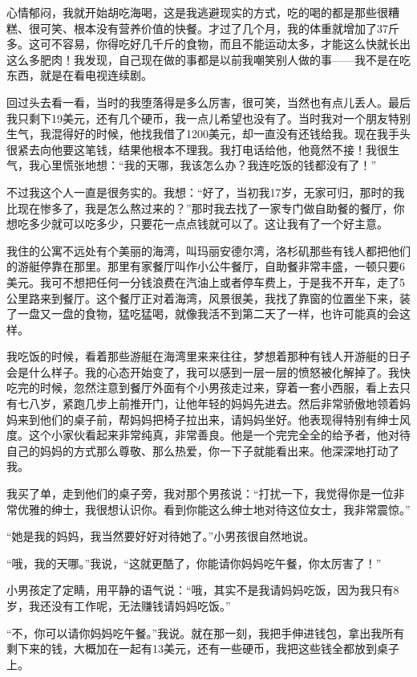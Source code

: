 心情郁闷，我就开始胡吃海喝，这是我逃避现实的方式，吃的喝的都是那些很糟糕、很可笑、根本没有营养价值的快餐。才过了几个月，我的体重就增加了37斤多。这可不容易，你得吃好几千斤的食物，而且不能运动太多，才能这么快就长出这么多肥肉！我发现，自己现在做的事都是以前我嘲笑别人做的事——我不是在吃东西，就是在看电视连续剧。

回过头去看一看，当时的我堕落得是多么厉害，很可笑，当然也有点儿丢人。最后我只剩下19美元，还有几个硬币，我一点儿希望也没有了。当时我对一个朋友特别生气，我混得好的时候，他找我借了1200美元，却一直没有还钱给我。现在我手头很紧去向他要这笔钱，结果他根本不理我。我打电话给他，他竟然不接！我很生气，我心里慌张地想：“我的天哪，我该怎么办？我连吃饭的钱都没有了！”

不过我这个人一直是很务实的。我想：“好了，当初我17岁，无家可归，那时的我比现在惨多了，我是怎么熬过来的？”那时我去找了一家专门做自助餐的餐厅，你想吃多少就可以吃多少，只要花一点点钱就可以了。这让我有了一个好主意。

我住的公寓不远处有个美丽的海湾，叫玛丽安德尔湾，洛杉矶那些有钱人都把他们的游艇停靠在那里。那里有家餐厅叫作小公牛餐厅，自助餐非常丰盛，一顿只要6美元。我可不想把任何一分钱浪费在汽油上或者停车费上，于是我不开车，走了5公里路来到餐厅。这个餐厅正对着海湾，风景很美，我找了靠窗的位置坐下来，装了一盘又一盘的食物，猛吃猛喝，就像我活不到第二天了一样，也许可能真的会这样。

我吃饭的时候，看着那些游艇在海湾里来来往往，梦想着那种有钱人开游艇的日子会是什么样子。我的心态开始变了，我可以感到一层一层的愤怒被化解掉了。我快吃完的时候，忽然注意到餐厅外面有个小男孩走过来，穿着一套小西服，看上去只有七八岁，紧跑几步上前推开门，让他年轻的妈妈先进去。然后非常骄傲地领着妈妈来到他们的桌子前，帮妈妈把椅子拉出来，请妈妈坐好。他表现得特别有绅士风度。这个小家伙看起来非常纯真，非常善良。他是一个完完全全的给予者，他对待自己的妈妈的方式那么尊敬、那么热爱，你一下子就能看出来。他深深地打动了我。

我买了单，走到他们的桌子旁，我对那个男孩说：“打扰一下，我觉得你是一位非常优雅的绅士，我很想认识你。看到你能这么绅士地对待这位女士，我非常震惊。”

“她是我的妈妈，我当然要好好对待她了。”小男孩很自然地说。

“哦，我的天哪。”我说，“这就更酷了，你能请你妈妈吃午餐，你太厉害了！”

小男孩定了定睛，用平静的语气说：“哦，其实不是我请妈妈吃饭，因为我只有8岁，我还没有工作呢，无法赚钱请妈妈吃饭。”

“不，你可以请你妈妈吃午餐。”我说。就在那一刻，我把手伸进钱包，拿出我所有剩下来的钱，大概加在一起有13美元，还有一些硬币，我把这些钱全都放到桌子上。

